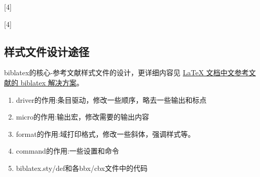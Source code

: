 \begin{texlist}
    [4]{%
      \ifuseprefix
        {%
         \isdot%
         }
        {%
         \isdot  %
         \addcomma\addspace%
         }
     }

     [4]{%
     }
\end{texlist}




\subsection{样式文件设计途径}
  biblatex的核心-参考文献样式文件的设计，更详细内容见
  \href{https://github.com/hushidong/biblatex-solution-to-latex-bibliography}{LaTeX 文档中文参考文献的 biblatex 解决方案}。
  \begin{enumerate}
    \item driver的作用:条目驱动，修改一些顺序，略去一些输出和标点
    \item micro的作用:输出宏，修改需要的输出内容
    \item format的作用:域打印格式，修改一些斜体，强调样式等。
    \item command的作用:一些设置和命令
    \item biblatex.sty/def和各bbx/cbx文件中的代码
  \end{enumerate}

